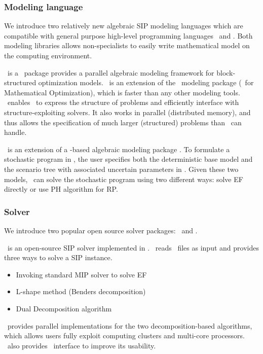 \subsubsection{Modeling language}
We introduce two relatively new algebraic SIP modeling languages which are compatible with general purpose high-level programming languages \julia\ and \python. Both modeling libraries allows non-specialists to easily write mathematical model on the computing environment.

\structjump\ is a \julia\ package provides a parallel algebraic modeling framework for block-structured optimization models. \structjump\ is an extension of the \jump\ modeling package (\julia\ for Mathematical Optimization), which is faster than any other modeling tools. \structjump\ enables \jump\ to express the structure of problems and efficiently interface with structure-exploiting solvers. It also works in parallel (distributed memory), and thus allows the specification of much larger (structured) problems than \jump\ can handle. 

\pysp\ is an extension of a \python-based algebraic modeling package \pyomo. To formulate a
stochastic program in \pysp, the user specifies both the deterministic base model and
the scenario tree with associated uncertain parameters in \pyomo. Given these two models, \pysp\ can solve the stochastic program using two different ways: solve EF directly or use PH algorithm for RP. %

\subsubsection{Solver}
We introduce two popular open source solver packages: \dsp\ and \pysp. 
 
\dsp\ is an open-source SIP solver implemented in \cpp. \dsp\ reads \smps\ files as input and provides three ways to solve a SIP instance.
\begin{itemize}
	\item Invoking standard MIP solver to solve EF
	\item L-shape method (Benders decomposition)
	\item Dual Decomposition algorithm
\end{itemize}
\dsp\ provides parallel implementations for the two decomposition-based algorithms, which allows users fully exploit computing clusters and multi-core processors. \dsp\ also provides \julia\ interface to improve its usability.

